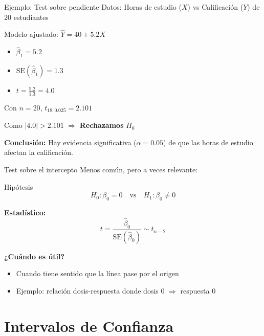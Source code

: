 \documentclass[aspectratio=169]{beamer}
\begin{document}
\begin{frame}{Ejemplo: Test sobre pendiente}
Datos: Horas de estudio ($X$) vs Calificación ($Y$) de 20 estudiantes

\vspace{0.3cm}
Modelo ajustado: $\hat{Y} = 40 + 5.2 X$

\begin{itemize}
    \item $\hat{\beta}_1 = 5.2$
    \item $\text{SE}(\hat{\beta}_1) = 1.3$
    \item $t = \frac{5.2}{1.3} = 4.0$
\end{itemize}

\vspace{0.3cm}
Con $n = 20$, $t_{18, 0.025} = 2.101$

\vspace{0.3cm}
Como $|4.0| > 2.101$ $\Rightarrow$ \textbf{Rechazamos} $H_0$

\vspace{0.3cm}
\textbf{Conclusión:} Hay evidencia significativa ($\alpha = 0.05$) de que las horas de estudio afectan la calificación.
\end{frame}

\begin{frame}{Test sobre el intercepto}
Menos común, pero a veces relevante:

\begin{block}{Hipótesis}
\[
H_0: \beta_0 = 0 \quad \text{vs} \quad H_1: \beta_0 \neq 0
\]
\end{block}

\textbf{Estadístico:}
\[
t = \frac{\hat{\beta}_0}{\text{SE}(\hat{\beta}_0)} \sim t_{n-2}
\]

\vspace{0.5cm}
\textbf{¿Cuándo es útil?}
\begin{itemize}
    \item Cuando tiene sentido que la línea pase por el origen
    \item Ejemplo: relación dosis-respuesta donde dosis 0 $\Rightarrow$ respuesta 0
\end{itemize}
\end{frame}

\section{Intervalos de Confianza}
\end{document}
